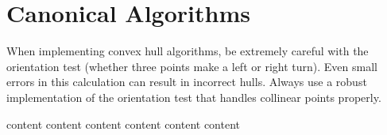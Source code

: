 \clearpage
\section{Canonical Algorithms}
\label{sec:canonical_algorithms}

\begin{warning}
When implementing convex hull algorithms, be extremely careful with the orientation test (whether three points make a left or right turn). Even small errors in this calculation can result in incorrect hulls. Always use a robust implementation of the orientation test that handles collinear points properly.
\end{warning}

{content}
{content}
{content}
{content}
{content} 
{content} 